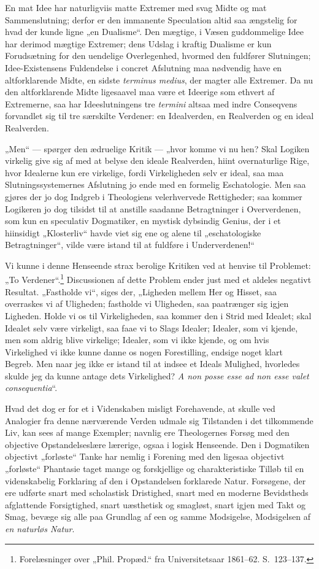 \documentclass[12pt]{book}
\newcommand{\opage}[1]{\marginnote{\footnotesize\textit{[#1]}}}
\begin{document}
En mat Idee har naturligviis matte Extremer med svag Midte og mat Sammenslutning; derfor er den immanente Speculation altid saa ængstelig for hvad der kunde ligne „en Dualisme“. Den mægtige, i Væsen guddommelige Idee har derimod mægtige Extremer; dens Udslag i kraftig Dualisme er kun Forudsætning for den uendelige Overlegenhed, hvormed den fuldfører Slutningen; Idee-Existensens Fuldendelse i concret Afslutning maa nødvendig have en altforklarende
\opage{458}Midte, en sidste \textit{terminus medius}, der magter alle Extremer. Da nu den altforklarende Midte ligesaavel maa være et Ideerige som ethvert af Extremerne, saa har Ideeslutningens tre \textit{termini} altsaa med indre Conseqvens forvandlet sig til tre særskilte Verdener: en Idealverden, en Realverden og en ideal Realverden.

„Men“ --- spørger den ædruelige Kritik --- „hvor komme vi nu hen? Skal Logiken virkelig give sig af med at belyse den ideale Realverden, hiint overnaturlige Rige, hvor Idealerne kun ere virkelige, fordi Virkeligheden selv er ideal, saa maa Slutningssystemernes Afslutning jo ende med en formelig Eschatologie. Men saa gjøres der jo dog Indgreb i Theologiens velerhvervede Rettigheder; saa kommer Logikeren jo dog tilsidst til at anstille saadanne Betragtninger i Oververdenen, som kun en speculativ Dogmatiker, en mystisk dybsindig Genius, der i et hiinsidigt „Klosterliv“ havde viet sig ene og alene til „eschatologiske Betragtninger“, vilde være istand til at fuldføre i Underverdenen!“

Vi kunne i denne Henseende strax berolige Kritiken ved at henvise til Problemet: „To Verdener“.\footnote{Forelæsninger over „Phil. Propæd.“ fra Universitetsaar 1861--62. S.~123--137.}%
{} Discussionen af dette Problem ender just med et aldeles negativt Resultat. „Fastholde vi“, siges der, „Ligheden mellem Her og Hisset, saa overraskes vi af Uligheden; fastholde vi Uligheden, saa paatrænger sig igjen Ligheden. Holde vi os til Virkeligheden, saa kommer den i Strid med Idealet; skal Idealet selv være virkeligt, saa faae vi to Slags Idealer; Idealer, som vi kjende, men som aldrig blive virkelige; Idealer, som vi ikke kjende, og om hvis Virkelighed vi ikke kunne danne os nogen Forestilling, endsige noget klart Begreb. Men naar jeg ikke er istand til at indsee et Ideals Mulighed, hvorledes skulde
\opage{459}jeg da kunne antage dets Virkelighed? \textit{A non posse esse ad non esse valet consequentia}“.

Hvad det dog er for et i Videnskaben misligt Forehavende, at skulle ved Analogier fra denne nærværende Verden udmale sig Tilstanden i det tilkommende Liv, kan sees af mange Exempler; navnlig ere Theologernes Forsøg med den objective Opstandelseslære lærerige, ogsaa i logisk Henseende. Den i Dogmatiken objectivt „forløste“ Tanke har nemlig i Forening med den ligesaa objectivt „forløste“ Phantasie taget mange og forskjellige og charakteristiske Tilløb til en videnskabelig Forklaring af den i Opstandelsen forklarede Natur. Forsøgene, der ere udførte snart med scholastisk Dristighed, snart med en moderne Bevidstheds afglattende Forsigtighed, snart uæsthetisk og smagløst, snart igjen med Takt og Smag, bevæge sig alle paa Grundlag af een og samme Modsigelse, Modsigelsen af \emph{en naturløs Natur}.
\end{document}
